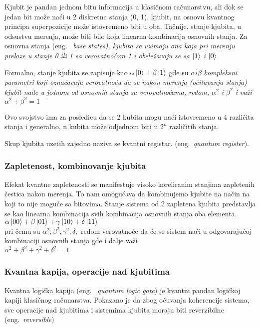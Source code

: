 \documentclass[a4paper]{article}
\begin{document}
{Kjubit je pandan jednom bitu informacija u klasičnom računarstvu, ali dok se jedan bit može naći u 2 diskretna stanja (0, 1),
kjubit, na osnovu kvantnog principa superpozicije može istovremeno biti u oba.
Tačnije, stanje kjubita, u odsustvu merenja, može biti bilo koja linearna kombinacija osnovnih stanja.
Za osnovna stanja (eng. ~\em base states). kjubita se uzimaju ona koja pri merenju prelaze u stanje 0 ili 1 sa verovatnoćom 1 i obeležavaju se sa $\ket{1}$ i $\ket{0}$

Formalno, stanje kjubita se zapisuje kao $\alpha \ket{0} + \beta \ket{1}$ gde su $\alpha i \beta$ \em{kompleksni} parametri koji označavaju verovatnoću da se nakon merenja (očitavanja stanja) kjubit nađe u jednom od osnovnih stanja sa verovatnoćama, redom, $\alpha^2$ i $\beta^2$ i važi $\alpha^2+\beta^2=1$

Ovo svojstvo ima za posledicu da se 2 kubita mogu naći istovremeno u 4 različita stanja i generalno, n kubita može odjednom biti u $2^n$ različitih stanja.

Skup kjubita uzetih zajedno naziva se kvantni registar. (eng.~\emph{quantum register}).

\subsubsection{Zapletenost, kombinovanje kjubita}
\label{entanglement}

Efekat kvantne zapletenosti se manifestuje visoko koreliranim stanjima zapletenih čestica nakon merenja.
To nam omogućava da kombinujemo kjubite na način na koji to nije moguće sa bitovima. Stanje sistema od 2 zapletena kjubita predstavlja se kao linearna kombinacija svih kombinacija osnovnih stanja oba elementa.\\

$\alpha\ket{00} + \beta\ket{01} + \gamma\ket{10} + \delta\ket{11}$\\

pri čemu su $\alpha^2, \beta^2, \gamma^2, \delta,$ redom verovatnoće da će se sistem naći u odgovarajućoj kombinaciji osnovnih stanja gde i dalje važi\\

$\alpha^2+\beta^2+\gamma^2+\delta^2=1$

\subsubsection {Kvantna kapija, operacije nad kjubitima}

Kvantna logička kapija (eng. ~\emph{quantum logic gate}) je kvantni pandan logičkoj kapiji klasičnog računarstva.
Pokazano je da zbog očuvanja koherencije sistema, sve operacije nad kjubitima i sistemima kjubita moraju biti reverzibilne (eng.~\emph{reversible}) \cite{basics}

}
\end{document}
